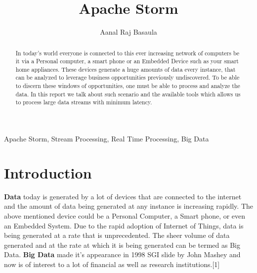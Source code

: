 \documentclass[runningheads,a4paper]{llncs}[2015/06/24]
\begin{document}
\title{Apache Storm}

\author{Aanal Raj Basaula}






\frontpageen %

\thispagestyle{empty}
\cleardoublepage

\maketitle

\begin{abstract}
In today's world everyone is connected to this ever increasing network of computers be it via a Personal computer, a smart phone or an Embedded Device such as your smart home appliances. These devices generate a huge amounts of data every instance, that can be analyzed to leverage business opportunities previously undiscovered. To be able to discern these windows of opportunities, one must be able to process and analyze the data. In this report we talk about such scenario and the available tools which allows us to process large data streams with minimum latency.
\end{abstract}

\begin{keywords}
Apache Storm, Stream Processing, Real Time Processing, Big Data
\end{keywords}

\section{Introduction}

\textbf{Data} today is generated by a lot of devices that are connected to the internet and the amount of data being generated at any instance is increasing rapidly. The above mentioned device could be a Personal Computer, a Smart phone, or even an Embedded System. Due to the rapid adoption of Internet of Things, data is being generated at a rate that is unprecedented. The sheer volume of data generated and at the rate at which it is being generated can be termed as Big Data. \textbf{Big Data} made it's appearance in 1998 SGI slide by John Mashey and now is of interest to a lot of financial as well as research institutions.[1]
\end{document}
